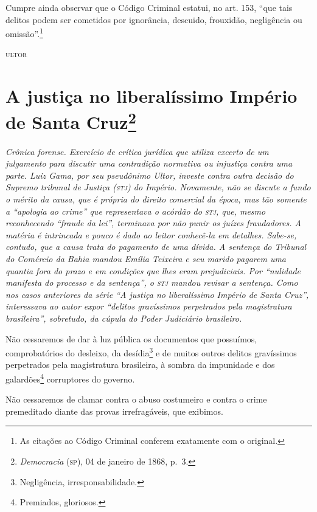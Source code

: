 Cumpre ainda observar que o Código Criminal estatui, no art. 153, ``que
tais delitos podem ser cometidos por ignorância, descuido, frouxidão,
negligência ou omissão''.\footnote{As citações ao Código Criminal
  conferem exatamente com o original.}

\begin{flushright}
\textsc{ultor}
\end{flushright}

\chapter{A justiça no liberalíssimo Império de Santa Cruz\footnote{\emph{Democracia} (\textsc{sp}), 04 de janeiro de 1868, p.~3.}}

\begin{didascalia}
\emph{Crônica forense. Exercício de crítica jurídica que utiliza excerto
de um julgamento para discutir uma contradição normativa ou injustiça
contra uma parte. Luiz Gama, por seu pseudônimo Ultor, investe
contra outra decisão do Supremo tribunal de Justiça (\textsc{stj}) do Império.
Novamente, não se discute a fundo o mérito da causa, que é própria do
direito comercial da época, mas tão somente a ``apologia ao crime'' que
representava o acórdão do \textsc{stj}, que, mesmo reconhecendo ``fraude da lei'',
terminava por não punir os juízes fraudadores. A matéria é intrincada e
pouco é dado ao leitor conhecê-la em detalhes. Sabe-se, contudo, que a
causa trata do pagamento de uma dívida. A sentença do Tribunal do
Comércio da Bahia mandou Emília Teixeira e seu marido pagarem uma
quantia fora do prazo e em condições que lhes eram prejudiciais. Por
``nulidade manifesta do processo e da sentença'', o \textsc{stj} mandou revisar a
sentença. Como nos casos anteriores da série ``A justiça no
liberalíssimo Império de Santa Cruz'', interessava ao autor expor
``delitos gravíssimos perpetrados pela magistratura brasileira'',
sobretudo, da cúpula do Poder Judiciário brasileiro.}
\end{didascalia}

Não cessaremos de dar à luz pública os documentos que possuímos,
comprobatórios do desleixo, da desídia\footnote{Negligência,
  irresponsabilidade.} e de muitos outros delitos gravíssimos
perpetrados pela magistratura brasileira, à sombra da impunidade e dos
galardões\footnote{Premiados, gloriosos.} corruptores do governo.

Não cessaremos de clamar contra o abuso costumeiro e contra o crime
premeditado diante das provas irrefragáveis, que exibimos.

